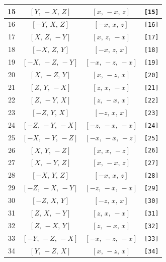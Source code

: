 \documentclass[fleqn,8pt]{jsarticle}
\begin{document}
\begin{longtable}{cccc}
15 & $\left[ Y,\, - X,\, Z \right]$ & $\left[ x,\, - x,\, z \right]$ & {\tt [15]} \\ \hline
16 & $\left[ - Y,\, X,\, Z \right]$ & $\left[ - x,\, x,\, z \right]$ & {\tt [16]} \\ \hline
17 & $\left[ X,\, Z,\, - Y \right]$ & $\left[ x,\, z,\, - x \right]$ & {\tt [17]} \\ \hline
18 & $\left[ - X,\, Z,\, Y \right]$ & $\left[ - x,\, z,\, x \right]$ & {\tt [18]} \\ \hline
19 & $\left[ - X,\, - Z,\, - Y \right]$ & $\left[ - x,\, - z,\, - x \right]$ & {\tt [19]} \\ \hline
20 & $\left[ X,\, - Z,\, Y \right]$ & $\left[ x,\, - z,\, x \right]$ & {\tt [20]} \\ \hline
21 & $\left[ Z,\, Y,\, - X \right]$ & $\left[ z,\, x,\, - x \right]$ & {\tt [21]} \\ \hline
22 & $\left[ Z,\, - Y,\, X \right]$ & $\left[ z,\, - x,\, x \right]$ & {\tt [22]} \\ \hline
23 & $\left[ - Z,\, Y,\, X \right]$ & $\left[ - z,\, x,\, x \right]$ & {\tt [23]} \\ \hline
24 & $\left[ - Z,\, - Y,\, - X \right]$ & $\left[ - z,\, - x,\, - x \right]$ & {\tt [24]} \\ \hline
25 & $\left[ - X,\, - Y,\, - Z \right]$ & $\left[ - x,\, - x,\, - z \right]$ & {\tt [25]} \\ \hline
26 & $\left[ X,\, Y,\, - Z \right]$ & $\left[ x,\, x,\, - z \right]$ & {\tt [26]} \\ \hline
27 & $\left[ X,\, - Y,\, Z \right]$ & $\left[ x,\, - x,\, z \right]$ & {\tt [27]} \\ \hline
28 & $\left[ - X,\, Y,\, Z \right]$ & $\left[ - x,\, x,\, z \right]$ & {\tt [28]} \\ \hline
29 & $\left[ - Z,\, - X,\, - Y \right]$ & $\left[ - z,\, - x,\, - x \right]$ & {\tt [29]} \\ \hline
30 & $\left[ - Z,\, X,\, Y \right]$ & $\left[ - z,\, x,\, x \right]$ & {\tt [30]} \\ \hline
31 & $\left[ Z,\, X,\, - Y \right]$ & $\left[ z,\, x,\, - x \right]$ & {\tt [31]} \\ \hline
32 & $\left[ Z,\, - X,\, Y \right]$ & $\left[ z,\, - x,\, x \right]$ & {\tt [32]} \\ \hline
33 & $\left[ - Y,\, - Z,\, - X \right]$ & $\left[ - x,\, - z,\, - x \right]$ & {\tt [33]} \\ \hline
34 & $\left[ Y,\, - Z,\, X \right]$ & $\left[ x,\, - z,\, x \right]$ & {\tt [34]} \\ \hline

\end{longtable}
\end{document}
